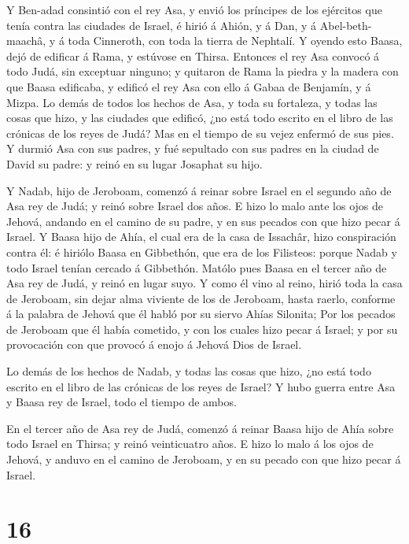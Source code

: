  Y Ben-adad consintió con el rey Asa, y envió los príncipes
de los ejércitos que tenía contra las ciudades de Israel, é hirió á
Ahión, y á Dan, y á Abel-beth-maachâ, y á toda Cinneroth, con toda la
tierra de Nephtalí.  Y oyendo esto Baasa, dejó de edificar
á Rama, y estúvose en Thirsa.  Entonces el rey Asa convocó
á todo Judá, sin exceptuar ninguno; y quitaron de Rama la piedra y la
madera con que Baasa edificaba, y edificó el rey Asa con ello á Gabaa de
Benjamín, y á Mizpa.  Lo demás de todos los hechos de Asa,
y toda su fortaleza, y todas las cosas que hizo, y las ciudades que
edificó, ¿no está todo escrito en el libro de las crónicas de los reyes
de Judá? Mas en el tiempo de su vejez enfermó de sus pies. 
Y durmió Asa con sus padres, y fué sepultado con sus padres en la ciudad
de David su padre: y reinó en su lugar Josaphat su hijo.

 Y Nadab, hijo de Jeroboam, comenzó á reinar sobre Israel
en el segundo año de Asa rey de Judá; y reinó sobre Israel dos años.
 E hizo lo malo ante los ojos de Jehová, andando en el
camino de su padre, y en sus pecados con que hizo pecar á Israel.
 Y Baasa hijo de Ahía, el cual era de la casa de Issachâr,
hizo conspiración contra él: é hiriólo Baasa en Gibbethón, que era de
los Filisteos: porque Nadab y todo Israel tenían cercado á Gibbethón.
 Matólo pues Baasa en el tercer año de Asa rey de Judá, y
reinó en lugar suyo.  Y como él vino al reino, hirió toda
la casa de Jeroboam, sin dejar alma viviente de los de Jeroboam, hasta
raerlo, conforme á la palabra de Jehová que él habló por su siervo Ahías
Silonita;  Por los pecados de Jeroboam que él había
cometido, y con los cuales hizo pecar á Israel; y por su provocación con
que provocó á enojo á Jehová Dios de Israel.

 Lo demás de los hechos de Nadab, y todas las cosas que
hizo, ¿no está todo escrito en el libro de las crónicas de los reyes de
Israel?  Y hubo guerra entre Asa y Baasa rey de Israel,
todo el tiempo de ambos.

 En el tercer año de Asa rey de Judá, comenzó á reinar
Baasa hijo de Ahía sobre todo Israel en Thirsa; y reinó veinticuatro
años.  E hizo lo malo á los ojos de Jehová, y anduvo en el
camino de Jeroboam, y en su pecado con que hizo pecar á Israel.

\hypertarget{section-15}{%
\section{16}\label{section-15}}

